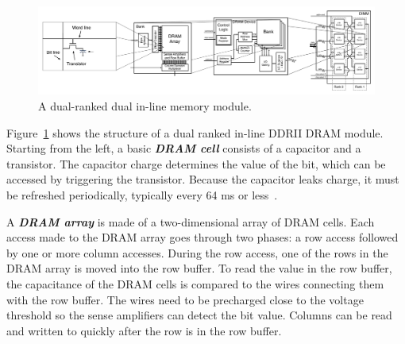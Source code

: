 \begin{figure}[h]
\begin{center}
\vspace{-8mm}
\includegraphics[width=\textwidth]{figs/dram-overview.pdf}
\vspace{-8mm}
\caption{A dual-ranked dual in-line memory module.}\label{fig:dram_basics}
\vspace{-5mm}
\end{center}
\end{figure} 

Figure~\ref{fig:dram_basics} shows the structure of a dual ranked in-line DDRII DRAM module.
Starting from the left, a basic \textbf{\emph{DRAM cell}} consists of a capacitor and a transistor. 
The capacitor charge determines the value of the bit, which can be accessed by triggering the transistor. 
Because the capacitor leaks charge, it must be refreshed periodically, typically every 64 ms or less~\cite{jedec}.

A \textbf{\emph{DRAM array}} is made of a two-dimensional array of DRAM cells.
Each access made to the DRAM array goes through two phases: a row access followed by one or more column accesses.   
During the row access, one of the rows in the DRAM array is moved into the row buffer.
To read the value in the row buffer, the capacitance of the DRAM cells is compared to the wires connecting them with the row buffer.
The wires need to be precharged close to the voltage threshold so the sense amplifiers can detect the bit value.
Columns can be read and written to quickly after the row is in the row buffer. 

